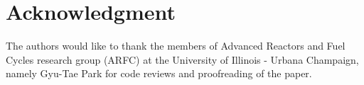 \section{Acknowledgment}

The authors would like to thank the members of Advanced Reactors and
Fuel Cycles research group (ARFC) at the University
of Illinois - Urbana Champaign, namely Gyu-Tae Park for code
reviews and proofreading of the paper.
